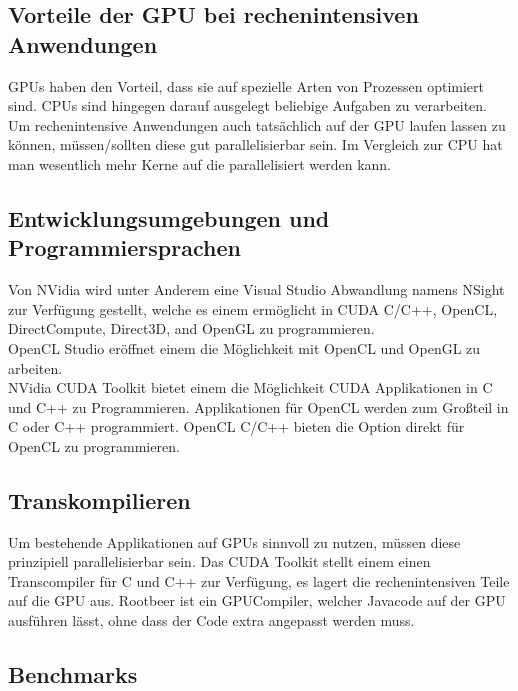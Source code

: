 \subsection{Vorteile der GPU bei rechenintensiven Anwendungen}
\label{sec:Vorteile der GPU bei rechenintensiven Anwendungen}
GPUs haben den Vorteil, dass sie auf spezielle Arten von Prozessen optimiert sind. CPUs sind hingegen darauf ausgelegt beliebige Aufgaben zu verarbeiten. Um rechenintensive Anwendungen auch tatsächlich auf der GPU laufen lassen zu können, müssen/sollten diese gut parallelisierbar sein. 
Im Vergleich zur CPU hat man wesentlich mehr Kerne auf die parallelisiert werden kann.

\subsection{Entwicklungsumgebungen und Programmiersprachen}
Von NVidia wird unter Anderem eine Visual Studio Abwandlung namens NSight zur Verfügung gestellt, welche es einem ermöglicht in CUDA C/C++, OpenCL, DirectCompute, Direct3D, and OpenGL zu programmieren.\\
OpenCL Studio eröffnet einem die Möglichkeit mit OpenCL und OpenGL zu arbeiten.\\
NVidia CUDA Toolkit bietet einem die Möglichkeit CUDA Applikationen in C und C++ zu Programmieren.
Applikationen für OpenCL werden zum Großteil in C oder C++ programmiert. OpenCL C/C++ bieten die Option direkt für OpenCL zu programmieren.

\subsection{Transkompilieren}
Um bestehende Applikationen auf GPUs sinnvoll zu nutzen, müssen diese prinzipiell parallelisierbar sein.
Das CUDA Toolkit stellt einem einen Transcompiler für C und C++ zur Verfügung, es lagert die rechenintensiven Teile auf die GPU aus.
Rootbeer ist ein GPUCompiler, welcher Javacode auf der GPU ausführen lässt, ohne dass der Code extra angepasst werden muss.

\subsection{Benchmarks}
